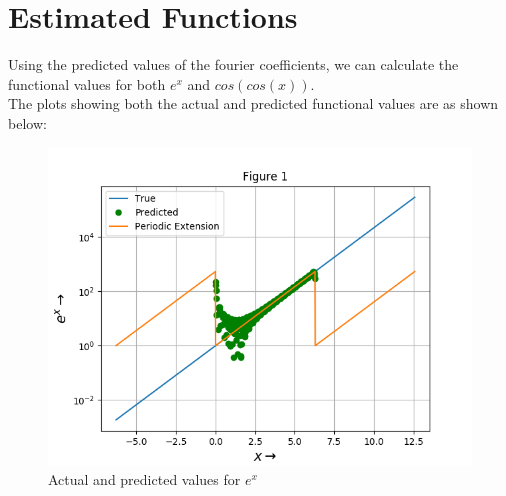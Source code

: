 \documentclass[11pt, a4paper]{article}
\begin{document}
\section{Estimated Functions}
Using the predicted values of the fourier coefficients, we can calculate the functional values for both $e^{x}$ and $cos(cos(x))$. \\
The plots showing both the actual and predicted functional values are as shown below:

 	\begin{figure}[!tbh]
   	\centering
   	\includegraphics[scale=0.6]{Figure_1a.png}   
   	\caption{Actual and predicted values for $e^{x}$}
   	\label{fig:sample}
   \end{figure} 
   
\end{document}
